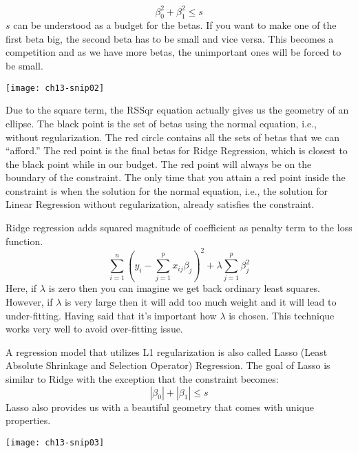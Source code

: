 \begin{equation}
\beta_{0}^{2}+\beta_{1}^{2} \leq s
\end{equation}
$s$ can be understood as a budget for the betas. If you want to make one of the first beta big, the second beta has to be small and vice versa. This becomes a competition and as we have more betas, the unimportant ones will be forced to be small.
\begin{marginfigure}
\texttt{[image: ch13-snip02]}
\end{marginfigure}
Due to the square term, the \ac{RSSqr} equation actually gives us the geometry of an ellipse. The black point is the set of betas using the normal equation, i.e., without regularization. The red circle contains all the sets of betas that we can ``afford.'' The red point is the final betas for Ridge Regression, which is closest to the black point while in our budget. The red point will always be on the boundary of the constraint. The only time that you attain a red point inside the constraint is when the solution for the normal equation, i.e., the solution for Linear Regression without regularization, already satisfies the constraint.

Ridge regression adds squared magnitude of coefficient as penalty term to the loss function.
\begin{equation}
\sum_{i=1}^{n}\left(y_{i}-\sum_{j=1}^{p} x_{i j} \beta_{j}\right)^{2}+\lambda \sum_{j=1}^{p} \beta_{j}^{2}
\end{equation}
Here, if $\lambda$ is zero then you can imagine we get back ordinary least squares. However, if $\lambda$  is very large then it will add too much weight and it will lead to under-fitting. Having said that it's important how $\lambda$  is chosen. This technique works very well to avoid over-fitting issue.



A regression model that utilizes L1 regularization is also called Lasso (Least Absolute Shrinkage and Selection Operator) Regression. The goal of Lasso is similar to Ridge with the exception that the constraint becomes:
\begin{equation}
\left|\beta_{0}\right|+\left|\beta_{1}\right| \leq s
\end{equation}
Lasso also provides us with a beautiful geometry that comes with unique properties.
\begin{marginfigure}
\texttt{[image: ch13-snip03]}
\end{marginfigure}

